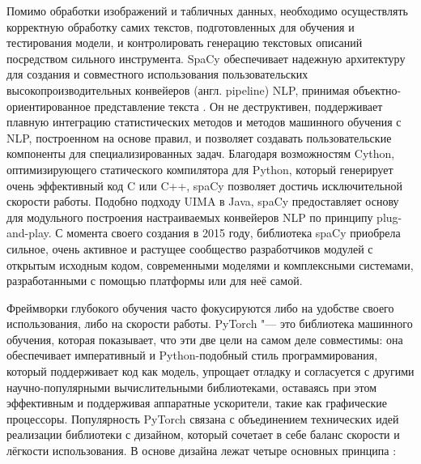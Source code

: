 \documentclass[bachelor, och, coursework]{SCWorks}
\begin{document}
        Помимо обработки изображений и табличных данных, необходимо осуществлять
        корректную обработку самих текстов, подготовленных для обучения и
        тестирования модели, и контролировать генерацию текстовых описаний
        посредством сильного инструмента. SpaCy обеспечивает надежную
        архитектуру для создания и совместного использования пользовательских
        высокопроизводительных конвейеров (англ. pipeline) NLP, принимая
        объектно-ориентированное представление текста \cite{spacy}. Он не
        деструктивен, поддерживает плавную интеграцию статистических методов и
        методов машинного обучения с NLP, построенном на основе правил, и
        позволяет создавать пользовательские компоненты для специализированных
        задач. Благодаря возможностям Cython, оптимизирующего статического
        компилятора для Python, который генерирует очень эффективный код C или
        C++, spaCy позволяет достичь исключительной скорости работы. Подобно
        подходу UIMA в Java, spaCy предоставляет основу для модульного
        построения настраиваемых конвейеров NLP по принципу plug-and-play. С
        момента своего создания в 2015 году, библиотека spaCy приобрела сильное,
        очень активное и растущее сообщество разработчиков модулей с открытым
        исходным кодом, современными моделями и комплексными системами,
        разработанными с помощью платформы или для неё самой.
        
        Фреймворки глубокого обучения часто фокусируются либо на удобстве своего
        использования, либо на скорости работы. PyTorch "--- это библиотека
        машинного обучения, которая показывает, что эти две цели на самом деле
        совместимы: она обеспечивает императивный и Python-подобный стиль
        программирования, который поддерживает код как модель, упрощает отладку
        и согласуется с другими научно-популярными вычислительными библиотеками,
        оставаясь при этом эффективным и поддерживая аппаратные ускорители,
        такие как графические процессоры. Популярность PyTorch связана с
        объединением технических идей реализации библиотеки с дизайном, который
        сочетает в себе баланс скорости и лёгкости использования. В основе
        дизайна лежат четыре основных принципа \cite{pytorch}:
\end{document}
